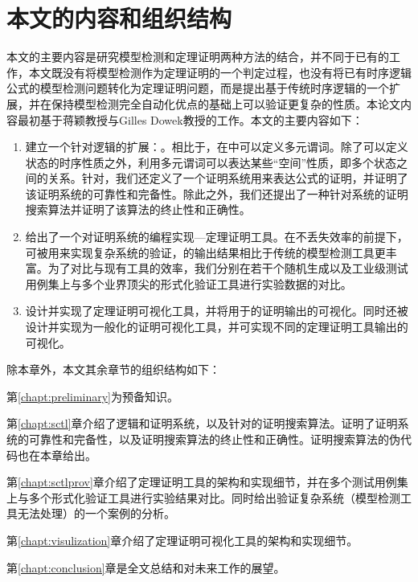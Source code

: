 \section{本文的内容和组织结构}
本文的主要内容是研究模型检测和定理证明两种方法的结合，并不同于已有的工作，本文既没有将模型检测作为定理证明的一个判定过程，也没有将已有时序逻辑公式的模型检测问题转化为定理证明问题，而是提出基于传统时序逻辑的一个扩展，并在保持模型检测完全自动化优点的基础上可以验证更复杂的性质。本论文内容最初基于蒋颖教授与Gilles Dowek教授的工作\cite{GY13}。本文的主要内容如下：
\begin{enumerate}
	\item 建立一个针对\CTL{}逻辑的扩展：\CTLP{}。相比于\CTL{}，在\CTLP{}中可以定义多元谓词。除了可以定义状态的时序性质之外，利用多元谓词可以表达某些“空间”性质，即多个状态之间的关系。针对\CTLP{}，我们还定义了一个证明系统\SCTL{}用来表达\CTLP{}公式的证明，并证明了该证明系统的可靠性和完备性。除此之外，我们还提出了一种针对\SCTL{}系统的证明搜索算法并证明了该算法的终止性和正确性。
	\item 给出了一个对证明系统\SCTL{}的编程实现---定理证明工具\sctlprov{}。在不丢失效率的前提下，\sctlprov{}可被用来实现复杂系统的验证，\sctlprov{}的输出结果相比于传统的模型检测工具更丰富。为了对比\sctlprov{}与现有工具的效率，我们分别在若干个随机生成以及工业级测试用例集上与多个业界顶尖的形式化验证工具进行实验数据的对比。
	\item 设计并实现了定理证明可视化工具，并将用于\sctlprov{}的证明输出的可视化。同时还被设计并实现为一般化的证明可视化工具，并可实现不同的定理证明工具输出的可视化。
\end{enumerate}

除本章外，本文其余章节的组织结构如下：

第\ref{chapt:preliminary}为预备知识。

第\ref{chapt:sctl}章介绍了\CTLP{}逻辑和证明系统\SCTL{}，以及针对\SCTL{}的证明搜索算法。证明了\SCTL{}证明系统的可靠性和完备性，以及证明搜索算法的终止性和正确性。证明搜索算法的伪代码也在本章给出。


第\ref{chapt:sctlprov}章介绍了定理证明工具\sctlprov{}的架构和实现细节，并在多个测试用例集上与多个形式化验证工具进行实验结果对比。同时给出\sctlprov{}验证复杂系统（模型检测工具无法处理）的一个案例的分析。

第\ref{chapt:visulization}章介绍了定理证明可视化工具的架构和实现细节。

第\ref{chapt:conclusion}章是全文总结和对未来工作的展望。